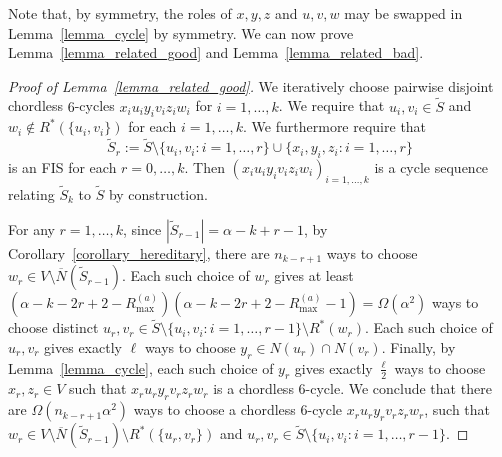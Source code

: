 \documentclass{article}
\theoremstyle{plain}
\theoremstyle{remark}
\theoremstyle{plain}
\numberwithin{equation}{section}
\begin{document}
	Note that, by symmetry, the roles of $x,y,z$ and $u,v,w$ may be swapped in Lemma~\ref{lemma_cycle} by symmetry. We can now prove Lemma~\ref{lemma_related_good} and Lemma~\ref{lemma_related_bad}.
	
	\begin{proof}[Proof of Lemma~\ref{lemma_related_good}]
		We iteratively choose pairwise disjoint chordless $6$-cycles $x_iu_iy_iv_iz_iw_i$ for $i=1,\ldots,k$. We require that $u_i,v_i\in\widetilde{S}$ and $w_i\not\in R^*(\{u_i,v_i\})$ for each $i=1,\ldots,k$. We furthermore require that $$\widetilde{S}_r:=\widetilde{S}\setminus\{u_i,v_i:i=1,\ldots,r\}\cup\{x_i,y_i,z_i:i=1,\ldots,r\}$$ is an FIS for each $r=0,\ldots,k$. Then $(x_iu_iy_iv_iz_iw_i)_{i=1,\ldots,k}$ is a cycle sequence relating $\widetilde{S}_k$ to $\widetilde{S}$ by construction.
		
		For any $r=1,\ldots,k$, since $|\widetilde{S}_{r-1}|=\alpha-k+r-1$, by Corollary~\ref{corollary_hereditary}, there are $n_{k-r+1}$ ways to choose $w_r\in V\setminus\overline{N}(\widetilde{S}_{r-1})$. Each such choice of $w_r$ gives at least $(\alpha-k-2r+2-R_{\max}^{(a)})(\alpha-k-2r+2-R_{\max}^{(a)}-1)=\Omega(\alpha^2)$ ways to choose distinct $u_r,v_r\in\widetilde{S}\setminus\{u_i,v_i:i=1,\ldots,r-1\}\setminus R^*(w_r)$. Each such choice of $u_r,v_r$ gives exactly $\ell$ ways to choose $y_r\in N(u_r)\cap N(v_r)$. Finally, by Lemma~\ref{lemma_cycle}, each such choice of $y_r$ gives exactly $\tfrac{\ell}{2}$ ways to choose $x_r,z_r\in V$ such that $x_ru_ry_rv_rz_rw_r$ is a chordless $6$-cycle. We conclude that there are $\Omega(n_{k-r+1}\alpha^2)$ ways to choose a chordless $6$-cycle $x_ru_ry_rv_rz_rw_r$, such that $w_r\in V\setminus\overline{N}(\widetilde{S}_{r-1})\setminus R^*(\{u_r,v_r\})$ and $u_r,v_r\in\widetilde{S}\setminus\{u_i,v_i:i=1,\ldots,r-1\}$.
		

\end{proof}
\end{document}
